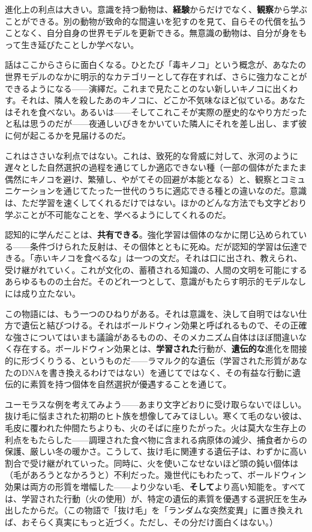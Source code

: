 \documentclass[11pt, twoside, openright]{book}
\begin{document}
進化上の利点は大きい。意識を持つ動物は、\textbf{経験}からだけでなく、\textbf{観察}から学ぶことができる。別の動物が致命的な間違いを犯すのを見て、自らその代償を払うことなく、自分自身の世界モデルを更新できる。無意識の動物は、自分が身をもって生き延びたことしか学べない。

話はここからさらに面白くなる。ひとたび「毒キノコ」という概念が、あなたの世界モデルのなかに明示的なカテゴリーとして存在すれば、さらに強力なことができるようになる------演繹だ。これまで見たことのない新しいキノコに出くわす。それは、隣人を殺したあのキノコに、どこか不気味なほど似ている。あなたはそれを食べない。あるいは------そしてこれこそが実際の歴史的なやり方だったと私は思うのだが------夜通しいびきをかいていた隣人にそれを差し出し、まず彼に何が起こるかを見届けるのだ。

これはささいな利点ではない。これは、致死的な脅威に対して、氷河のように遅々とした自然選択の過程を通じてしか適応できない種（一部の個体がたまたま偶然にキノコを避け、繁殖し、やがてその回避が本能となる）と、観察とコミュニケーションを通じてたった一世代のうちに適応できる種との違いなのだ。意識は、ただ学習を速くしてくれるだけではない。ほかのどんな方法でも文字どおり学ぶことが不可能なことを、学べるようにしてくれるのだ。

認知的に学んだことは、\textbf{共有できる}。強化学習は個体のなかに閉じ込められている------条件づけられた反射は、その個体とともに死ぬ。だが認知的学習は伝達できる。「赤いキノコを食べるな」は一つの文だ。それは口に出され、教えられ、受け継がれていく。これが文化の、蓄積される知識の、人間の文明を可能にするあらゆるものの土台だ。そのどれ一つとして、意識がもたらす明示的モデルなしには成り立たない。

この物語には、もう一つのひねりがある。それは意識を、決して自明ではない仕方で遺伝と結びつける。それはボールドウィン効果と呼ばれるもので、その正確な強さについてはいまも議論があるものの、そのメカニズム自体はほぼ間違いなく存在する。ボールドウィン効果とは、\textbf{学習された}行動が、\textbf{遺伝的な}進化を間接的に形づくりうる、というものだ------ラマルク的な遺伝（学習された形質があなたのDNAを書き換えるわけではない）を通じてではなく、その有益な行動に遺伝的に素質を持つ個体を自然選択が優遇することを通じて。

ユーモラスな例を考えてみよう------あまり文字どおりに受け取らないでほしい。抜け毛に悩まされた初期のヒト族を想像してみてほしい。寒くて毛のない彼は、毛皮に覆われた仲間たちよりも、火のそばに座りたがった。火は莫大な生存上の利点をもたらした------調理された食べ物に含まれる病原体の減少、捕食者からの保護、厳しい冬の暖かさ。こうして、抜け毛に関連する遺伝子は、わずかに高い割合で受け継がれていった。同時に、火を使いこなせないほど頭の鈍い個体は（毛があろうとなかろうと）不利だった。幾世代にもわたって、ボールドウィン効果は両方の形質を増幅した------より少ない毛、\textbf{そして}より高い知能を。すべては、学習された行動（火の使用）が、特定の遺伝的素質を優遇する選択圧を生み出したからだ。（この物語で「抜け毛」を「ランダムな突然変異」に置き換えれば、おそらく真実にもっと近づく。ただし、その分だけ面白くはない。）
\end{document}
